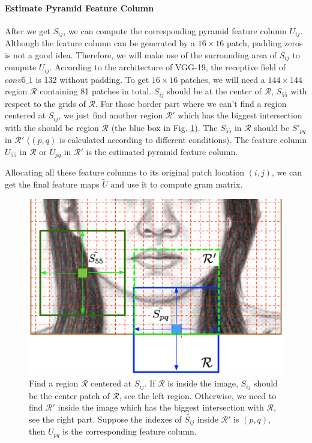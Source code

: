 \documentclass[10pt,twocolumn,letterpaper]{article}
\begin{document}
\paragraph*{Estimate Pyramid Feature Column}
After we get $S_{ij}$, we can compute the corresponding pyramid feature column $U_{ij}$. Although the feature column can be generated by a $16\times16$ patch, padding zeros is not a good idea. Therefore, we will make use of the surrounding area of $S_{ij}$ to compute $U_{ij}$. According to the architecture of VGG-19, the receptive field of $conv5\_1$ is 132 without padding. To get $16\times16$ patches, we will need a $144\times144$ region $\mathcal{R}$ containing 81 patches in total. $S_{ij}$ should be at the center of $\mathcal{R}$, \ie $S_{55}$ with respect to the grids of $\mathcal{R}$. For those border part where we can't find a region centered at $S_{ij}$, we just find another region $\mathcal{R}'$ which has the biggest intersection with the should be region $\mathcal{R}$ (the blue box in Fig. \ref{fig:border_example}). The $S_{55}$ in $\mathcal{R}$  should be $S'_{pq}$ in $\mathcal{R}'$ ($(p, q)$ is calculated according to different conditions). The feature column $U_{55}$ in $\mathcal{R}$ or $U_{pq}$ in $\mathcal{R'}$ is the estimated pyramid feature column. 

Allocating all these feature columns to its original patch location $(i, j)$, we can get the final feature maps $\tilde{U}$ and use it to compute gram matrix.  

\begin{figure}[htbp]
\centering
\includegraphics[width=0.99\linewidth]{img/border_PFC.eps}
\caption{Find a region $\mathcal{R}$ centered at $S_{ij}$. If $\mathcal{R}$ is inside the image, $S_{ij}$ should be the center patch of $\mathcal{R}$, see the left region. Otherwise, we need to find $\mathcal{R}'$ inside the image which has the biggest intersection with $\mathcal{R}$, see the right part. Suppose the indexes of $\tilde{S_{ij}}$ inside $\mathcal{R}'$ is $(p, q)$, then $U_{pq}$ is the corresponding feature column.}
\label{fig:border_example}
\end{figure}
\end{document}
